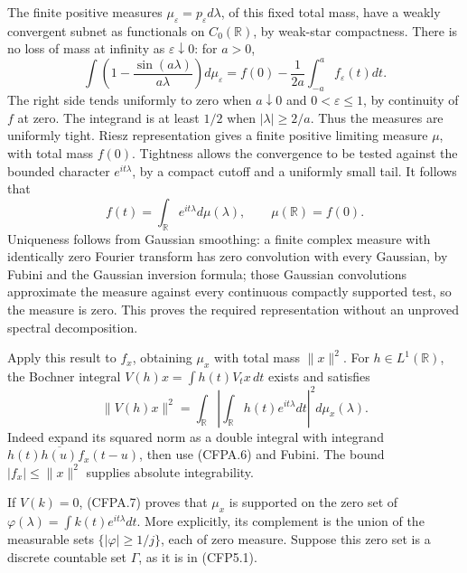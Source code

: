 The finite positive measures \(\mu_\varepsilon=p_\varepsilon d\lambda\),
of this fixed total mass, have a weakly convergent subnet as functionals
on \(C_0(\mathbb R)\), by weak-star compactness. There is no loss of
mass at infinity as \(\varepsilon\downarrow0\): for \(a>0\), \[
\int\left(1-\frac{\sin(a\lambda)}{a\lambda}\right)d\mu_\varepsilon
=f(0)-\frac1{2a}\int_{-a}^a f_\varepsilon(t)dt.
\tag{CFPA.5}
\] The right side tends uniformly to zero when \(a\downarrow0\) and
\(0<\varepsilon\le1\), by continuity of \(f\) at zero. The integrand is
at least \(1/2\) when \(|\lambda|\ge2/a\). Thus the measures are
uniformly tight. Riesz representation gives a finite positive limiting
measure \(\mu\), with total mass \(f(0)\). Tightness allows the
convergence to be tested against the bounded character
\(e^{it\lambda}\), by a compact cutoff and a uniformly small tail. It
follows that \[
f(t)=\int_{\mathbb R}e^{it\lambda}d\mu(\lambda),
\qquad \mu(\mathbb R)=f(0).
\tag{CFPA.6}
\] Uniqueness follows from Gaussian smoothing: a finite complex measure
with identically zero Fourier transform has zero convolution with every
Gaussian, by Fubini and the Gaussian inversion formula; those Gaussian
convolutions approximate the measure against every continuous compactly
supported test, so the measure is zero. This proves the required
representation without an unproved spectral decomposition.

Apply this result to \(f_x\), obtaining \(\mu_x\) with total mass
\(\|x\|^2\). For \(h\in L^1(\mathbb R)\), the Bochner integral
\(V(h)x=\int h(t)V_tx\,dt\) exists and satisfies \[
\|V(h)x\|^2
=\int_{\mathbb R}\left|\int_{\mathbb R}h(t)e^{it\lambda}dt\right|^2d\mu_x(\lambda).
\tag{CFPA.7}
\] Indeed expand its squared norm as a double integral with integrand
\(h(t)\overline{h(u)}f_x(t-u)\), then use (CFPA.6) and Fubini. The bound
\(|f_x|\le\|x\|^2\) supplies absolute integrability.

If \(V(k)=0\), (CFPA.7) proves that \(\mu_x\) is supported on the zero
set of \(\varphi(\lambda)=\int k(t)e^{it\lambda}dt\). More explicitly,
its complement is the union of the measurable sets
\(\{|\varphi|\ge1/j\}\), each of zero measure. Suppose this zero set is
a discrete countable set \(\Gamma\), as it is in (CFP5.1).

